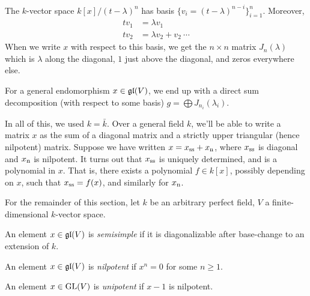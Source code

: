 The $k$-vector space $k[x]/(t-\lambda)^n$ has basis 
$\{v_i=(t-\lambda)^{n-i}\}_{i=1}^n$. Moreover, 
\begin{align*}
  t v_1 &= \lambda v_1 \\
  t v_2 &= \lambda v_2 + v_2 \
  \cdots 
\end{align*}
When we write $x$ with respect to this basis, we get the $n\times n$ matrix 
$J_n(\lambda)$ which is $\lambda$ along the diagonal, $1$ just above the 
diagonal, and zeros everywhere else. 

For a general endomorphism $x\in \mathfrak{gl}(V)$, we end up with a direct sum 
decomposition (with respect to some basis) $g=\bigoplus J_{n_i}(\lambda_i)$. 


In all of this, we used $k=\bar k$. Over a general field $k$, we'll be able to 
write a matrix $x$ as the sum of a diagonal matrix and a strictly upper 
triangular (hence nilpotent) matrix. Suppose we have written 
$x=x_{\mathrm{ss}}+x_{\mathrm{n}}$, where $x_{\mathrm{ss}}$ is diagonal and 
$x_{\mathrm{n}}$ is nilpotent. It turns out that $x_{\mathrm{ss}}$ is uniquely 
determined, and is a polynomial in $x$. That is, there exists a polynomial 
$f\in k[x]$, possibly depending on $x$, such that $x_{\mathrm{ss}}=f(x)$, and 
similarly for $x_{\mathrm{n}}$. 

For the remainder of this section, let $k$ be an arbitrary perfect field, $V$ 
a finite-dimensional $k$-vector space. 

\begin{definition}
An element $x\in \mathfrak{gl}(V)$ is \emph{semisimple} if it is diagonalizable after 
base-change to an extension of $k$.  
\end{definition}

\begin{definition}
An element $x\in \mathfrak{gl}(V)$ is \emph{nilpotent} if $x^n=0$ for some $n\geqslant 1$. 
\end{definition}

\begin{definition}
An element $x\in \operatorname{GL}(V)$ is \emph{unipotent} if $x-1$ is nilpotent. 
\end{definition}

